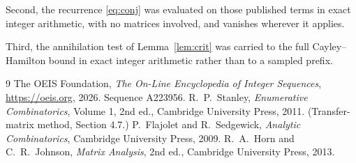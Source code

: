 \documentclass[11pt,a4paper]{article}
\theoremstyle{plain}
\theoremstyle{definition}
\begin{document}
Second, the recurrence \eqref{eq:conj} was evaluated on those published terms in exact
integer arithmetic, with no matrices involved, and vanishes wherever it applies.

Third, the annihilation test of Lemma~\ref{lem:crit} was carried to the full
Cayley--Hamilton bound in exact integer arithmetic rather than to a sampled prefix.

\begin{thebibliography}{9}
 The OEIS Foundation, \emph{The On-Line Encyclopedia of Integer
Sequences}, \url{https://oeis.org}, 2026. Sequence A223956.
 R.~P.~Stanley, \emph{Enumerative Combinatorics}, Volume 1, 2nd ed.,
Cambridge University Press, 2011. (Transfer-matrix method, Section 4.7.)
 P.~Flajolet and R.~Sedgewick, \emph{Analytic Combinatorics}, Cambridge
University Press, 2009.
 R.~A.~Horn and C.~R.~Johnson, \emph{Matrix Analysis}, 2nd ed., Cambridge
University Press, 2013.
\end{thebibliography}
\end{document}
